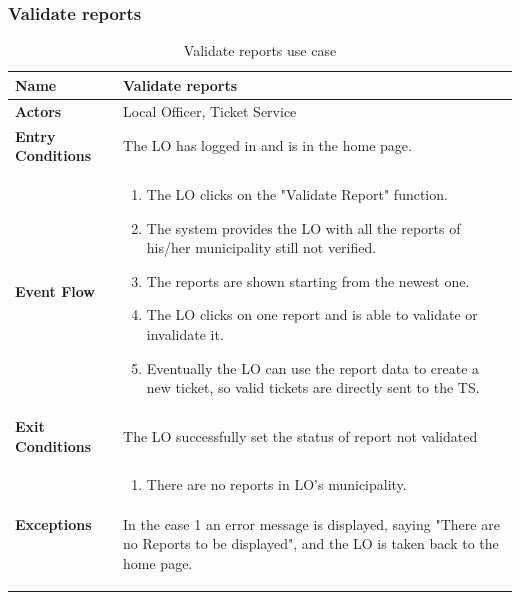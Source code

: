 					\subsubsection{Validate reports}
					\begin{table}[!h]
						\centering
						\vspace{-2mm}
						\begin{tabular}{lp{}}
							\toprule
							\textbf{Name} & \textbf{Validate reports} \\[1mm]
							\midrule
							\textbf{Actors} & Local Officer, Ticket Service \\[1mm]
							\textbf{Entry Conditions} & The LO has logged in and is in the home page. \vspace{1mm}\\
							\textbf{Event Flow} &
							\vspace{-5mm} 
							\begin{enumerate}
								\setlength\itemsep{0.2mm}
								\item The LO clicks on the "Validate Report" function.
								\item The system provides the LO with all the reports of his/her municipality still not verified.
								\item The reports are shown starting from the newest one.
								\item The LO clicks on one report and is able to validate or invalidate it.
								\item Eventually the LO can use the report data to create a new ticket, so valid tickets are directly sent to the TS.
							\end{enumerate} \\
							\textbf{Exit Conditions} & The LO successfully set the status of report not validated \vspace{1mm}\\
							\textbf{Exceptions} & 
								\vspace{-5mm} 
								\begin{enumerate}
									\item There are no reports in LO's municipality.
								\end{enumerate}
								\vspace{-7mm}
								\paragraph{}
									In the case 1 an error message is displayed, saying "There are no Reports to be displayed", and the LO is taken back to the home page. \\
							\bottomrule
						\end{tabular}
						\caption{Validate reports use case}
					\end{table}
			\clearpage	
